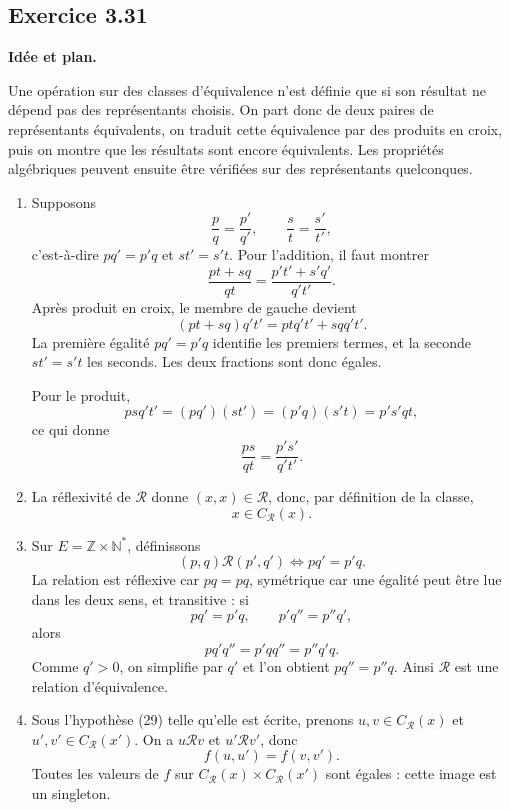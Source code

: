 \documentclass[11pt,a4paper]{article}
\newcommand{\Z}{\mathbb Z}
\newcommand{\N}{\mathbb N}
\newcommand{\1}{\mathbf 1}
\newenvironment{corrige}[1]{%
  \Needspace{5\baselineskip}%
  \subsection*{Exercice #1}%
  \addcontentsline{toc}{subsection}{Exercice #1}%
}{\medskip}
\newenvironment{methode}{%
  \begin{center}\begin{minipage}{0.94\linewidth}
  \color{MATblue}\textbf{Idée et plan.}\enspace
}{%
  \end{minipage}\end{center}
}
\begin{document}
\begin{corrige}{3.31}
\begin{methode}
Une opération sur des classes d'équivalence n'est définie que si son résultat ne dépend pas des représentants choisis. On part donc de deux paires de représentants équivalents, on traduit cette équivalence par des produits en croix, puis on montre que les résultats sont encore équivalents. Les propriétés algébriques peuvent ensuite être vérifiées sur des représentants quelconques.
\end{methode}
\begin{enumerate}
  \item Supposons
  \[
  \frac pq=\frac{p'}{q'},
  \qquad
  \frac st=\frac{s'}{t'},
  \]
  c'est-à-dire $pq'=p'q$ et $st'=s't$. Pour l'addition, il faut montrer
  \[
  \frac{pt+sq}{qt}=\frac{p't'+s'q'}{q't'}.
  \]
  Après produit en croix, le membre de gauche devient
  \[
  (pt+sq)q't'=ptq't'+sqq't'.
  \]
  La première égalité $pq'=p'q$ identifie les premiers termes, et la seconde $st'=s't$ les seconds. Les deux fractions sont donc égales.

  Pour le produit,
  \[
  psq't'=(pq')(st')=(p'q)(s't)=p's'qt,
  \]
  ce qui donne
  \[
  \frac{ps}{qt}=\frac{p's'}{q't'}.
  \]

  \item La réflexivité de $\mathcal R$ donne $(x,x)\in\mathcal R$, donc, par définition de la classe,
  \[
  \boxed{x\in C_{\mathcal R}(x)}.
  \]

  \item Sur $E=\Z\times\N^*$, définissons
  \[
  (p,q)\mathrel{\mathcal R}(p',q')
  \iff pq'=p'q.
  \]
  La relation est réflexive car $pq=pq$, symétrique car une égalité peut être lue dans les deux sens, et transitive : si
  \[
  pq'=p'q,
  \qquad p'q''=p''q',
  \]
  alors
  \[
  p q' q''=p' q q''=p''q'q.
  \]
  Comme $q'>0$, on simplifie par $q'$ et l'on obtient $pq''=p''q$. Ainsi $\mathcal R$ est une relation d'équivalence.

  \item Sous l'hypothèse (29) telle qu'elle est écrite, prenons $u,v\in C_{\mathcal R}(x)$ et $u',v'\in C_{\mathcal R}(x')$. On a $u\mathcal R v$ et $u'\mathcal R v'$, donc
  \[
  f(u,u')=f(v,v').
  \]
  Toutes les valeurs de $f$ sur $C_{\mathcal R}(x)\times C_{\mathcal R}(x')$ sont égales : cette image est un singleton.


\end{enumerate}
\end{corrige}
\end{document}
